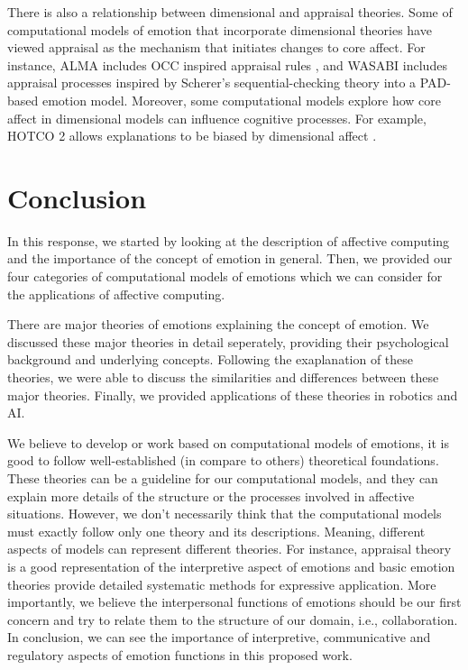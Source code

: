 \documentclass[11pt]{article}
\begin{document}
There is also a relationship between dimensional and appraisal theories. Some of
computational models of emotion that incorporate dimensional theories have
viewed appraisal as the mechanism that initiates changes to core affect. For
instance, ALMA \cite{gebhard:alma} includes OCC inspired appraisal rules
\cite{occ:structure}, and WASABI \cite{becker:wasabi} includes appraisal
processes inspired by Scherer's sequential-checking theory into a PAD-based
emotion model. Moreover, some computational models explore how core affect in
dimensional models can influence cognitive processes. For example, HOTCO 2
\cite{thagard:emotional-coherence} allows explanations to be biased by
dimensional affect \cite{marsella:computational-models}.

\section{Conclusion}
\label{sec:conclusion}

In this response, we started by looking at the description of affective
computing and the importance of the concept of emotion in general. Then, we
provided our four categories of computational models of emotions which we can
consider for the applications of affective computing.

There are major theories of emotions explaining the concept of emotion. We
discussed these major theories in detail seperately, providing their
psychological background and underlying concepts. Following the exaplanation of
these theories, we were able to discuss the similarities and differences between
these major theories. Finally, we provided applications of these theories in
robotics and AI.

We believe to develop or work based on computational models of emotions, it is
good to follow well-established (in compare to others) theoretical foundations.
These theories can be a guideline for our computational models, and they can
explain more details of the structure or the processes involved in affective
situations. However, we don't necessarily think that the computational models
must exactly follow only one theory and its descriptions. Meaning, different
aspects of models can represent different theories. For instance, appraisal
theory is a good representation of the interpretive aspect of emotions and
basic emotion theories provide detailed systematic methods for expressive
application. More importantly, we believe the interpersonal functions of
emotions should be our first concern and try to relate them to the structure of
our domain, i.e., collaboration. In conclusion, we can see the importance of
interpretive, communicative and regulatory aspects of emotion functions in this
proposed work.



\end{document}
